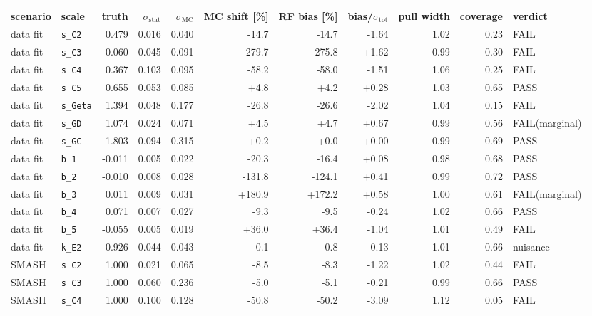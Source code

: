 \begin{tabular}{llrrrrrrrrl}
\toprule
scenario & scale & truth & $\sigma_\mathrm{stat}$ & $\sigma_\mathrm{MC}$ & MC shift [\%] & RF bias [\%] & bias/$\sigma_\mathrm{tot}$ & pull width & coverage & verdict \\
\midrule
data fit & \texttt{s\_C2} & 0.479 & 0.016 & 0.040 & -14.7 & -14.7 & -1.64 & 1.02 & 0.23 & FAIL \\
data fit & \texttt{s\_C3} & -0.060 & 0.045 & 0.091 & -279.7 & -275.8 & +1.62 & 0.99 & 0.30 & FAIL \\
data fit & \texttt{s\_C4} & 0.367 & 0.103 & 0.095 & -58.2 & -58.0 & -1.51 & 1.06 & 0.25 & FAIL \\
data fit & \texttt{s\_C5} & 0.655 & 0.053 & 0.085 & +4.8 & +4.2 & +0.28 & 1.03 & 0.65 & PASS \\
data fit & \texttt{s\_Geta} & 1.394 & 0.048 & 0.177 & -26.8 & -26.6 & -2.02 & 1.04 & 0.15 & FAIL \\
data fit & \texttt{s\_GD} & 1.074 & 0.024 & 0.071 & +4.5 & +4.7 & +0.67 & 0.99 & 0.56 & FAIL(marginal) \\
data fit & \texttt{s\_GC} & 1.803 & 0.094 & 0.315 & +0.2 & +0.0 & +0.00 & 0.99 & 0.69 & PASS \\
data fit & \texttt{b\_1} & -0.011 & 0.005 & 0.022 & -20.3 & -16.4 & +0.08 & 0.98 & 0.68 & PASS \\
data fit & \texttt{b\_2} & -0.010 & 0.008 & 0.028 & -131.8 & -124.1 & +0.41 & 0.99 & 0.72 & PASS \\
data fit & \texttt{b\_3} & 0.011 & 0.009 & 0.031 & +180.9 & +172.2 & +0.58 & 1.00 & 0.61 & FAIL(marginal) \\
data fit & \texttt{b\_4} & 0.071 & 0.007 & 0.027 & -9.3 & -9.5 & -0.24 & 1.02 & 0.66 & PASS \\
data fit & \texttt{b\_5} & -0.055 & 0.005 & 0.019 & +36.0 & +36.4 & -1.04 & 1.01 & 0.49 & FAIL \\
data fit & \texttt{k\_E2} & 0.926 & 0.044 & 0.043 & -0.1 & -0.8 & -0.13 & 1.01 & 0.66 & nuisance \\
\midrule
SMASH & \texttt{s\_C2} & 1.000 & 0.021 & 0.065 & -8.5 & -8.3 & -1.22 & 1.02 & 0.44 & FAIL \\
SMASH & \texttt{s\_C3} & 1.000 & 0.060 & 0.236 & -5.0 & -5.1 & -0.21 & 0.99 & 0.66 & PASS \\
SMASH & \texttt{s\_C4} & 1.000 & 0.100 & 0.128 & -50.8 & -50.2 & -3.09 & 1.12 & 0.05 & FAIL \\

\end{tabular}
